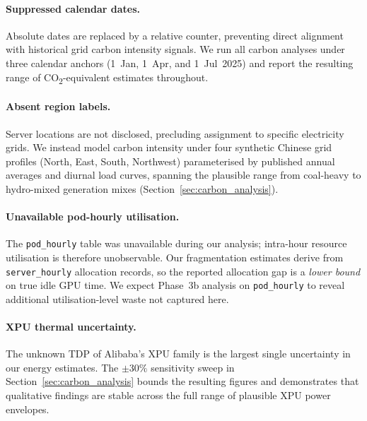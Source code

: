 \paragraph{Suppressed calendar dates.}
Absolute dates are replaced by a relative counter, preventing direct
alignment with historical grid carbon intensity signals.
We run all carbon analyses under three calendar anchors
(1~Jan, 1~Apr, and 1~Jul~2025) and report the resulting range of
\mbox{CO\textsubscript{2}}-equivalent estimates throughout.

\paragraph{Absent region labels.}
Server locations are not disclosed, precluding assignment to specific
electricity grids.
We instead model carbon intensity under four synthetic Chinese grid
profiles (North, East, South, Northwest) parameterised by published
annual averages and diurnal load curves, spanning the plausible range
from coal-heavy to hydro-mixed generation mixes
(Section~\ref{sec:carbon_analysis}).

\paragraph{Unavailable pod-hourly utilisation.}
The \texttt{pod\_hourly} table was unavailable during our analysis;
intra-hour resource utilisation is therefore unobservable.
Our fragmentation estimates derive from \texttt{server\_hourly}
allocation records, so the reported allocation gap is a
\emph{lower bound} on true idle GPU time.
We expect Phase~3b analysis on \texttt{pod\_hourly} to reveal
additional utilisation-level waste not captured here.

\paragraph{XPU thermal uncertainty.}
The unknown TDP of Alibaba's XPU family is the largest single
uncertainty in our energy estimates.
The $\pm30\%$ sensitivity sweep in Section~\ref{sec:carbon_analysis}
bounds the resulting figures and demonstrates that qualitative
findings are stable across the full range of plausible XPU power
envelopes.